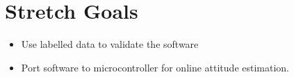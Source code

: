 \documentclass{article}
\begin{document}
\section{Stretch Goals}

\begin{itemize}
    \item Use labelled data to validate the software
    \item Port software to microcontroller for online attitude estimation.
\end{itemize}

{}

\end{document}
